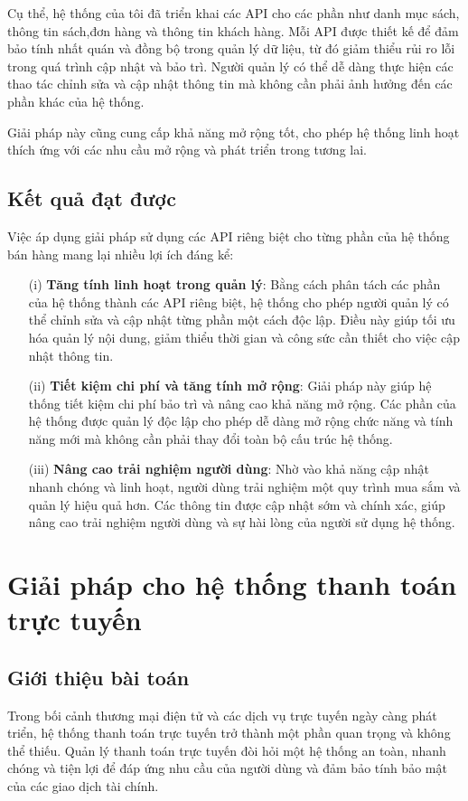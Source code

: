 \documentclass[../DoAn.tex]{subfiles}
\begin{document}
Cụ thể, hệ thống của tôi đã triển khai các API cho các phần như danh mục sách, thông tin sách,đơn hàng và thông tin khách hàng. Mỗi API được thiết kế để đảm bảo tính nhất quán và đồng bộ trong quản lý dữ liệu, từ đó giảm thiểu rủi ro lỗi trong quá trình cập nhật và bảo trì. Người quản lý có thể dễ dàng thực hiện các thao tác chỉnh sửa và cập nhật thông tin mà không cần phải ảnh hưởng đến các phần khác của hệ thống.

Giải pháp này cũng cung cấp khả năng mở rộng tốt, cho phép hệ thống linh hoạt thích ứng với các nhu cầu mở rộng và phát triển trong tương lai.
\subsection{Kết quả đạt được}
Việc áp dụng giải pháp sử dụng các API riêng biệt cho từng phần của hệ thống bán hàng mang lại nhiều lợi ích đáng kể:
\begin{enumerate}
    \item[(i)] \textbf{Tăng tính linh hoạt trong quản lý}: Bằng cách phân tách các phần của hệ thống thành các API riêng biệt, hệ thống cho phép người quản lý có thể chỉnh sửa và cập nhật từng phần một cách độc lập. Điều này giúp tối ưu hóa quản lý nội dung, giảm thiểu thời gian và công sức cần thiết cho việc cập nhật thông tin.
    \item[(ii)] \textbf{Tiết kiệm chi phí và tăng tính mở rộng}: Giải pháp này giúp hệ thống tiết kiệm chi phí bảo trì và nâng cao khả năng mở rộng. Các phần của hệ thống được quản lý độc lập cho phép dễ dàng mở rộng chức năng và tính năng mới mà không cần phải thay đổi toàn bộ cấu trúc hệ thống.
    \item[(iii)] \textbf{Nâng cao trải nghiệm người dùng}: Nhờ vào khả năng cập nhật nhanh chóng và linh hoạt, người dùng trải nghiệm một quy trình mua sắm và quản lý hiệu quả hơn. Các thông tin được cập nhật sớm và chính xác, giúp nâng cao trải nghiệm người dùng và sự hài lòng của người sử dụng hệ thống.
\end{enumerate}


\section{Giải pháp cho hệ thống thanh toán trực tuyến}
\subsection{Giới thiệu bài toán}
Trong bối cảnh thương mại điện tử và các dịch vụ trực tuyến ngày càng phát triển, hệ thống thanh toán trực tuyến trở thành một phần quan trọng và không thể thiếu. Quản lý thanh toán trực tuyến đòi hỏi một hệ thống an toàn, nhanh chóng và tiện lợi để đáp ứng nhu cầu của người dùng và đảm bảo tính bảo mật của các giao dịch tài chính.
\end{document}
